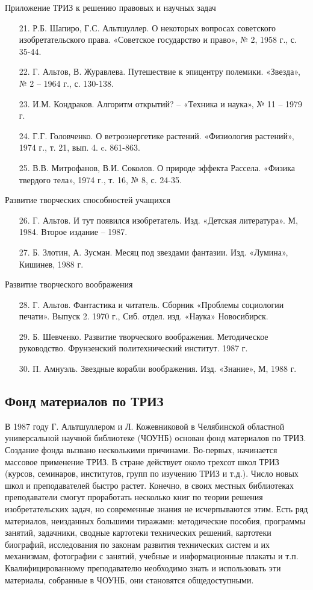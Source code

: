 \documentclass[11pt,a4paper]{article}
\begin{document}
Приложение ТРИЗ к решению правовых и научных задач
\begin{itemize}
\item[21.] Р.Б. Шапиро, Г.С. Альтшуллер. О некоторых вопросах советского
  изобретательского права. «Советское государство и право», № 2, 1958 г.,
  с. 35-44.
\item[22.] Г. Альтов, В. Журавлева. Путешествие к эпицентру полемики.
  «Звезда», № 2 -- 1964 г., с. 130-138.
\item[23.] И.М. Кондраков. Алгоритм открытий? -- «Техника и наука», № 11 --
  1979 г.
\item[24.] Г.Г. Головченко. О ветроэнергетике растений. «Физиология растений»,
  1974 г., т. 21, вып. 4. c. 861-863.
\item[25.] В.В. Митрофанов, В.И. Соколов. О природе эффекта Рассела. «Физика
  твердого тела», 1974 г., т. 16, № 8, с. 24-35.
\end{itemize}
Развитие творческих способностей учащихся
\begin{itemize}
\item[26.] Г. Альтов. И тут появился изобретатель. Изд. «Детская литература».
  М, 1984. Второе издание -- 1987.
\item[27.] Б. Злотин, А. Зусман. Месяц под звездами фантазии. Изд. «Лумина»,
  Кишинев, 1988 г.
\end{itemize}
Развитие творческого воображения
\begin{itemize}
\item[28.] Г. Альтов. Фантастика и читатель. Сборник «Проблемы социологии
  печати».  Выпуск 2. 1970 г., Сиб. отдел. изд. «Наука» Новосибирск.
\item[29.] Б. Шевченко. Развитие творческого воображения. Методическое
  руководство. Фрунзенский политехнический институт. 1987 г.
\item[30.] П. Амнуэль. Звездные корабли воображения. Изд. «Знание», М, 1988 г.
\end{itemize}

\subsection{Фонд материалов по ТРИЗ}

В 1987 году Г. Альтшуллером и Л. Кожевниковой в Челябинской областной
универсальной научной библиотеке (ЧОУНБ) основан фонд материалов по ТРИЗ.
Создание фонда вызвано несколькими причинами. Во-первых, начинается массовое
применение ТРИЗ. В стране действует около трехсот школ ТРИЗ (курсов,
семинаров, институтов, групп по изучению ТРИЗ и т.д.). Число новых школ и
преподавателей быстро растет. Конечно, в своих местных библиотеках
преподаватели смогут проработать несколько книг по теории решения
изобретательских задач, но современные знания не исчерпываются этим. Есть ряд
материалов, неизданных большими тиражами: методические пособия, программы
занятий, задачники, сводные картотеки технических решений, картотеки
биографий, исследования по законам развития технических систем и их
механизмам, фотографии с занятий, учебные и информационные плакаты и т.п.
Квалифицированному преподавателю необходимо знать и использовать эти
материалы, собранные в ЧОУНБ, они становятся общедоступными.
\end{document}
